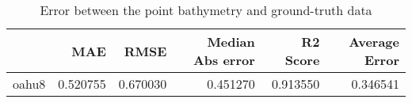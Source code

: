 \begin{table}[h!]
\centering
\caption{Error between the point bathymetry and ground-truth data}
\label{tab:oahu8_lidar_error}
\begin{tabular}{lrrrrr}
\toprule
 & MAE & RMSE & Median Abs error & R2 Score & Average Error \\
\midrule
oahu8 & 0.520755 & 0.670030 & 0.451270 & 0.913550 & 0.346541 \\
\bottomrule
\end{tabular}
\end{table}
